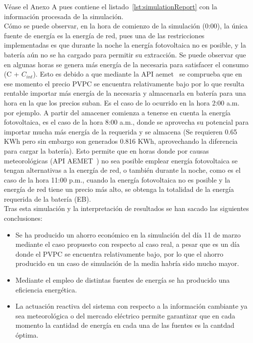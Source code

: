 Véase el Anexo A pues contiene el listado~\ref{lst:simulationReport} con la información procesada de la simulación.\\Cómo se puede observar, en la hora de comienzo de la simulación (0:00), la única fuente de energía es la energía de red, pues una de las restricciones implementadas es que durante la noche la energía fotovoltaica no es posible, y la batería aún no se ha cargado para permitir su extracción. Se puede observar que en algunas horas se genera más energía de la necesaria para satisfacer el consumo (C + $ C_{int} $). Esto es debido a que mediante la API aemet~\cite{Ree} se comprueba que en ese momento el precio PVPC se encuentra relativamente bajo por lo que resulta rentable importar más energía de la necesaria y almacenarla en batería para una hora en la que los precios suban. Es el caso de lo ocurrido en la hora 2:00 a.m. por ejemplo. A partir del amacener comienza a tenerse en cuenta la energía fotovoltaica, es el caso de la hora 8:00 a.m., donde se aprovecha su potencial para importar mucha más energía de la requerida y se almacena (Se requieren 0.65 KWh pero sin embargo son generados 0.816 KWh, aprovechando la diferencia para cargar la batería). Esto permite que en horas donde por causas meteorológicas (API AEMET~\cite{Aemet}) no sea posible emplear energía fotovoltaica se tengan alternativas a la energía de red, o también durante la noche, como es el caso de la hora 11:00 p.m., cuando la energía fotovoltaica no es posible y la energía de red tiene un precio más alto, se obtenga la totalidad de la energía requerida de la batería (EB).\\

Tras esta simulación y la interpretación de resultados se han sacado las siguientes conclusiones:
\begin{itemize}
\item Se ha producido un ahorro económico en la simulación del día 11 de marzo mediante el caso propuesto con respecto al caso real, a pesar que es un día donde el PVPC se encuentra relativamente bajo, por lo que el ahorro producido en un caso de simulación de la media habría sido mucho mayor.
\item Mediante el empleo de distintas fuentes de energía se ha producido una eficiencia energética.
  \item La actuación reactiva del sistema con respecto a la información cambiante ya sea meteorológica o del mercado eléctrico permite garantizar que en cada momento la cantidad de energía en cada una de las fuentes es la cantdad óptima.
\end{itemize}
